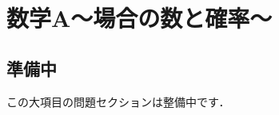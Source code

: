 \documentclass[../../ms_q.tex]{subfiles}
\begin{document}
\section{数学A～場合の数と確率～}

\subsection*{準備中}
この大項目の問題セクションは整備中です．
\end{document}
